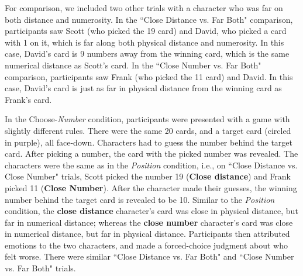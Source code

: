 \documentclass[10pt,letterpaper]{article}
\begin{document}
	For comparison, we included two other trials with a character who was far on both distance and numerosity. In the ``Close Distance vs. Far Both" comparison, participants saw Scott (who picked the 19 card) and David, who picked a card with 1 on it, which is far along both physical distance and numerosity. In this case, David's card is 9 numbers away from the winning card, which is the same numerical distance as Scott's card. In the ``Close Number vs. Far Both" comparison, participants saw Frank (who picked the 11 card) and David. In this case, David's card is just as far in physical distance from the winning card as Frank's card.


	In the Choose-\textit{Number} condition, participants were presented with a game with slightly different rules. There were the same 20 cards, and a target card (circled in purple), all face-down. Characters had to guess the number behind the target card. After picking a number, the card with the picked number was revealed. The characters were the same as in the \textit{Position} condition, i.e., on ``Close Distance vs. Close Number" trials, Scott picked the number 19 (\textbf{Close distance}) and Frank picked 11 (\textbf{Close Number}). After the character made their guesses, the winning number behind the target card is revealed to be 10. Similar to the \textit{Position} condition, the \textbf{close distance} character's card was close in physical distance, but far in numerical distance; whereas the \textbf{close number} character's card was close in numerical distance, but far in physical distance. Participants then attributed emotions to the two characters, and made a forced-choice judgment about who felt worse. There were similar ``Close Distance vs. Far Both" and ``Close Number vs. Far Both" trials.


\begin{table}
\caption{Predictions for Experiment 2. Near-miss effects are predicted to be strongest when agents are close on dimensions over which they have illusory control.}
\label{Expt2Predictions}
\end{table}
\end{document}

